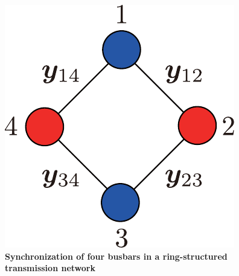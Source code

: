 \documentclass[graybox, envcountchap]{svmult}
\begin{document}
%

\begin{figure}[t]
\centering
\includegraphics[width = .20\linewidth]{figs/4busbox}
\medskip
\caption{\centering\textbf{Synchronization of four busbars in a ring-structured
transmission network}}
\label{fig:4busbox}
\medskip
\end{figure}
\end{document}
